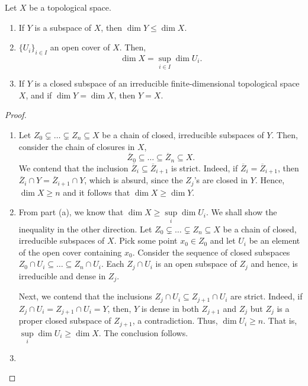 \begin{lemma}
    Let $X$ be a topological space.
    \begin{enumerate}[label=(\alph*)]
    \item If $Y$ is a subspace of $X$, then $\dim Y\le\dim X$.
    \item $\{U_i\}_{i\in I}$ an open cover of $X$. Then, 
    \begin{equation*}
        \dim X = \sup\limits_{i\in I}\dim U_i.
    \end{equation*}
    \item If $Y$ is a closed subspace of an irreducible finite-dimensional topological space $X$, and if $\dim Y = \dim X$, then $Y = X$.
    \end{enumerate}
\end{lemma}
\begin{proof}
\begin{enumerate}[label=(\alph*)]
    \item Let $Z_0\subsetneq\dots\subsetneq Z_n\subseteq X$ be a chain of closed, irreducible subspaces of $Y$. Then, consider the chain of closures in $X$, 
    \begin{equation*}
        \overline Z_0\subseteq\dots\subseteq\overline Z_n\subseteq X.
    \end{equation*}
    We contend that the inclusion $\overline Z_i\subseteq\overline Z_{i + 1}$ is strict. Indeed, if $\overline Z_i = \overline Z_{i + 1}$, then $\overline Z_i\cap Y = \overline Z_{i + 1}\cap Y$, which is absurd, since the $Z_j$'s are closed in $Y$. Hence, $\dim X\ge n$ and it follows that $\dim X\ge\dim Y$.

    \item From part (a), we know that $\dim X\ge\sup\limits_i \dim U_i$. We shall show the inequality in the other direction. Let $Z_0\subsetneq\dots\subsetneq Z_n\subseteq X$ be a chain of closed, irreducible subspaces of $X$. Pick some point $x_0\in Z_0$ and let $U_i$ be an element of the open cover containing $x_0$. Consider the sequence of closed subspaces $Z_0\cap U_i\subseteq\dots\subseteq Z_n\cap U_i$. Each $Z_j\cap U_i$ is an open subspace of $Z_j$ and hence, is irreducible and dense in $Z_j$. 

    Next, we contend that the inclusions $Z_j\cap U_i\subseteq Z_{j + 1}\cap U_i$ are strict. Indeed, if $Z_j\cap U_i = Z_{j + 1}\cap U_i = Y$, then, $Y$ is dense in both $Z_{j + 1}$ and $Z_j$ but $Z_j$ is a proper closed subspace of $Z_{j + 1}$, a contradiction. Thus, $\dim U_i\ge n$. That is, $\sup\limits_i\dim U_i\ge\dim X$. The conclusion follows. 

    \item {}
\end{enumerate}
\end{proof}

